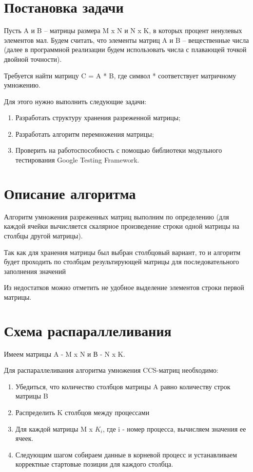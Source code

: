 \documentclass{report}
\begin{document}
\newpage
\section*{Постановка задачи}
\par Пусть A и B –  матрицы размера M x N и N x K, в которых процент ненулевых элементов мал. Будем считать, что элементы матриц A и B – вещественные числа (далее в программной реализации будем использовать числа с плавающей точкой двойной точности).
\par Требуется найти матрицу C = A * B, где символ * соответствует матричному умножению.
\par Для этого нужно выполнить следующие задачи:
\begin{enumerate}
\item Разработать структуру хранения разреженной матрицы;
\item Разработать алгоритм перемножения матрицы;
\item Проверить на работоспособность с помощью библиотеки модульного тестирования Google Testing Framework.
\end{enumerate}
\newpage

\section*{Описание алгоритма}
\par Алгоритм умножения разреженных матриц выполним по определению (для каждой ячейки вычисляется скалярное произведение строки одной матрицы на столбцы другой матрицы). 
\par Так как для хранения матрицы был выбран столбцовый вариант, то и алгоритм будет проходить по столбцам результирующей матрицы для последовательного заполнения значений
\par Из недостатков можно отметить не удобное выделение элементов строки первой матрицы.

\newpage
\section*{Схема распараллеливания}
\par Имеем матрицы A - M x N и В - N x K. 
\par Для распараллеливания алгоритма умножения CCS-матриц необходимо:
\begin{enumerate}
\item Убедиться, что количество столбцов  матрицы A равно количеству строк матрицы B
\item Распределить K столбцов между процессами
\item Для каждой матрицы M x $K_i$, где i - номер процесса, вычисляем значения ее ячеек.
\item Следующим шагом собираем данные в корневой процесс и устанавливаем корректные стартовые позиции для каждого столбца.
\end{enumerate}
\newpage
\end{document}
